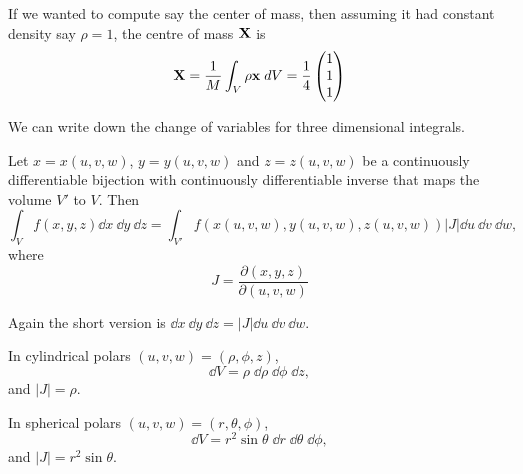 \documentclass[a4paper]{scrartcl}
\begin{document}
\begin{example}
If we wanted to compute say the center of mass, then assuming it had constant density say $\rho = 1$, the centre of mass $\mathbf{X}$ is
$$
\mathbf{X} = \frac{1}{M} \int_V \rho \mathbf{x} \; d V = \frac{1}{4}\begin{pmatrix}
	1\\ 1\\ 1
\end{pmatrix}
$$
\end{example}

We can write down the change of variables for three dimensional integrals.

\begin{proposition}
	Let $x = x(u, v, w)$, $y = y(u, v, w)$ and $z = z(u, v, w)$ be a continuously differentiable bijection with continuously differentiable inverse that maps the volume $V'$ to $V$. Then
	$$
	\int_V f(x, y, z) \dd x \ \dd y \ \dd z = \int_{V'} f(x(u, v, w), y(u, v, w), z(u, v, w)) |J| \dd u\  \dd v\ \dd w,
	$$
	where
	$$
	J = \frac{\partial(x, y, z)}{\partial(u, v, w)}
	$$
\end{proposition}
Again the short version is $\dd x\ \dd y\ \dd z = |J| \dd u\ \dd v\ \dd w$.

\begin{example}
	In cylindrical polars $(u, v, w) = (\rho, \phi, z)$,
	$$
	\dd V = \rho \; \dd\rho \; \dd \phi \; \dd z,
	$$
	and $|J| = \rho$.

	In spherical polars $(u, v, w) = (r, \theta, \phi)$,
	$$
	\dd V = r^2 \sin \theta \; \dd r \; \dd \theta \; \dd \phi,
	$$
	and $|J| = r^2 \sin \theta$.
\end{example}
\end{document}
